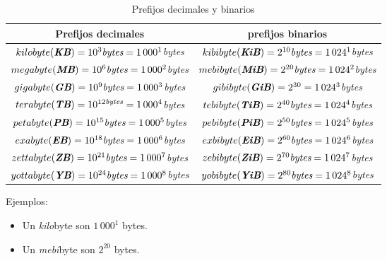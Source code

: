 \documentclass[12pt]{article}
\begin{document}
\begin{table}[h]

    \centering

    \caption{Prefijos decimales y binarios}
    \label{tablaComparacionPrefijos}

	\begin{spacing}{1.5}
	
    \begin{tabular}{ c | c }
        \hline
        \textbf{Prefijos decimales} &
        \textbf{prefijos binarios}\\
        \hline
        $kilobyte(\emph{\textbf{KB}})=10^{3}\emph{bytes}=1\,000^{1}$\emph{bytes} &
        $kibibyte(\emph{\textbf{KiB}})=2^{10}\emph{bytes}=1\,024^{1}$\emph{bytes} \\
        \hline
        $megabyte(\emph{\textbf{MB}})=10^{6}\emph{bytes}=1\,000^{2}$\emph{bytes} &
        $mebibyte(\emph{\textbf{MiB}})=2^{20}\emph{bytes}=1\,024^{2}$\emph{bytes} \\
        \hline
        $gigabyte(\emph{\textbf{GB}})=10^{9}\emph{bytes}=1\,000^{3}$\emph{bytes} &
        $gibibyte(\emph{\textbf{GiB}})=2^{30}=1\,024^{3}$\emph{bytes} \\
        \hline
        $terabyte(\emph{\textbf{TB}})=10^{12\emph{bytes}}=1\,000^{4}$\emph{bytes} &
        $tebibyte(\emph{\textbf{TiB}})=2^{40}\emph{bytes}=1\,024^{4}$\emph{bytes} \\
        \hline
        $petabyte(\emph{\textbf{PB}})=10^{15}\emph{bytes}=1\,000^{5}$\emph{bytes} &
        $pebibyte(\emph{\textbf{PiB}})=2^{50}\emph{bytes}=1\,024^{5}$\emph{bytes} \\
        \hline
        $exabyte(\emph{\textbf{EB}})=10^{18}\emph{bytes}=1\,000^{6}$\emph{bytes} &
        $exbibyte(\emph{\textbf{EiB}})=2^{60}\emph{bytes}=1\,024^{6}$\emph{bytes} \\
        \hline
        $zettabyte(\emph{\textbf{ZB}})=10^{21}\emph{bytes}=1\,000^{7}$\emph{bytes} &
        $zebibyte(\emph{\textbf{ZiB}})=2^{70}\emph{bytes}=1\,024^{7}$\emph{bytes} \\
        \hline
        $yottabyte(\emph{\textbf{YB}})=10^{24}\emph{bytes}=1\,000^{8}$\emph{bytes} &
        $yobibyte(\emph{\textbf{YiB}})=2^{80}\emph{bytes}=1\,024^{8}$\emph{bytes} \\
        \hline
    \end{tabular}
	\end{spacing}
\end{table}

Ejemplos:
\begin{itemize}
	\itemsep2pt \parskip0pt 
    \item   Un \emph{kilo}byte son $1\,000^{1}$ bytes.
    \item   Un \emph{mebi}byte son $2^{20}$ bytes.
\end{itemize}
\end{document}

